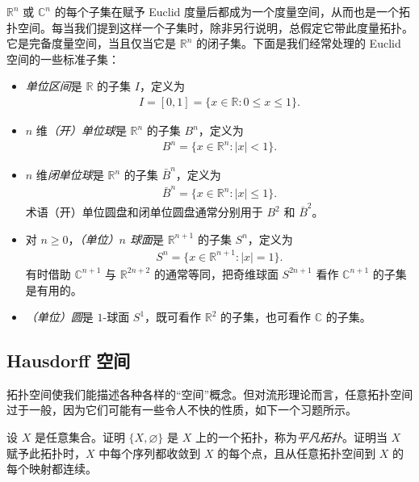 \documentclass[../../main.tex]{subfiles}
\begin{document}
\begin{example}\label{example:appA-subsets-of-euclidean}
$\mathbb R^n$ 或 $\mathbb C^n$ 的每个子集在赋予 Euclid 度量后都成为一个度量空间，从而也是一个拓扑空间。每当我们提到这样一个子集时，除非另行说明，总假定它带此度量拓扑。它是完备度量空间，当且仅当它是 $\mathbb R^n$ 的闭子集。下面是我们经常处理的 Euclid 空间的一些标准子集：
\begin{itemize}
\item \emph{单位区间}是 $\mathbb R$ 的子集 $I$，定义为
\begin{align*}
I=[0,1]=\{x\in\mathbb R:0\leqslant x\leqslant1\}.
\end{align*}
\item $n$ 维\emph{（开）单位球}是 $\mathbb R^n$ 的子集 $B^n$，定义为
\begin{align*}
B^n=\{x\in\mathbb R^n:|x|<1\}.
\end{align*}
\item $n$ 维\emph{闭单位球}是 $\mathbb R^n$ 的子集 $\bar B^n$，定义为
\begin{align*}
\bar B^n=\{x\in\mathbb R^n:|x|\leqslant1\}.
\end{align*}
术语（开）单位圆盘和闭单位圆盘通常分别用于 $B^2$ 和 $\bar B^2$。
\item 对 $n\geqslant0$，\emph{（单位）$n$ 球面}是 $\mathbb R^{n+1}$ 的子集 $S^n$，定义为
\begin{align*}
S^n=\{x\in\mathbb R^{n+1}:|x|=1\}.
\end{align*}
有时借助 $\mathbb C^{n+1}$ 与 $\mathbb R^{2n+2}$ 的通常等同，把奇维球面 $S^{2n+1}$ 看作 $\mathbb C^{n+1}$ 的子集是有用的。
\item \emph{（单位）圆}是 $1$-球面 $S^1$，既可看作 $\mathbb R^2$ 的子集，也可看作 $\mathbb C$ 的子集。
\end{itemize}
\end{example}

\subsection*{Hausdorff 空间}

拓扑空间使我们能描述各种各样的“空间”概念。但对流形理论而言，任意拓扑空间过于一般，因为它们可能有一些令人不快的性质，如下一个习题所示。

\begin{exercise}\label{exercise:appA-A-9}
设 $X$ 是任意集合。证明 $\{X,\varnothing\}$ 是 $X$ 上的一个拓扑，称为\emph{平凡拓扑}。证明当 $X$ 赋予此拓扑时，$X$ 中每个序列都收敛到 $X$ 的每个点，且从任意拓扑空间到 $X$ 的每个映射都连续。
\end{exercise}
\end{document}
